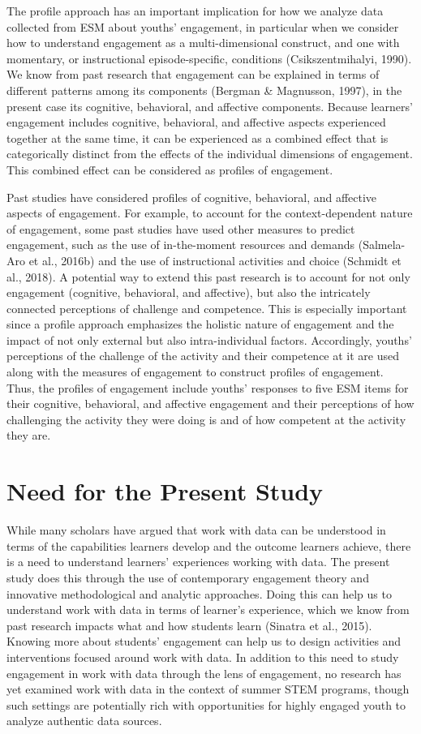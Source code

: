 \documentclass[]{book}
\theoremstyle{definition}
\theoremstyle{definition}
\theoremstyle{definition}
\theoremstyle{remark}
\begin{document}
The profile approach has an important implication for how we analyze
data collected from ESM about youths' engagement, in particular when we
consider how to understand engagement as a multi-dimensional construct,
and one with momentary, or instructional episode-specific, conditions
(Csikszentmihalyi, 1990). We know from past research that engagement can
be explained in terms of different patterns among its components
(Bergman \& Magnusson, 1997), in the present case its cognitive,
behavioral, and affective components. Because learners' engagement
includes cognitive, behavioral, and affective aspects experienced
together at the same time, it can be experienced as a combined effect
that is categorically distinct from the effects of the individual
dimensions of engagement. This combined effect can be considered as
profiles of engagement.

Past studies have considered profiles of cognitive, behavioral, and
affective aspects of engagement. For example, to account for the
context-dependent nature of engagement, some past studies have used
other measures to predict engagement, such as the use of in-the-moment
resources and demands (Salmela-Aro et al., 2016b) and the use of
instructional activities and choice (Schmidt et al., 2018). A potential
way to extend this past research is to account for not only engagement
(cognitive, behavioral, and affective), but also the intricately
connected perceptions of challenge and competence. This is especially
important since a profile approach emphasizes the holistic nature of
engagement and the impact of not only external but also intra-individual
factors. Accordingly, youths' perceptions of the challenge of the
activity and their competence at it are used along with the measures of
engagement to construct profiles of engagement. Thus, the profiles of
engagement include youths' responses to five ESM items for their
cognitive, behavioral, and affective engagement and their perceptions of
how challenging the activity they were doing is and of how competent at
the activity they are.

\section{Need for the Present Study}\label{need-for-the-present-study}

While many scholars have argued that work with data can be understood in
terms of the capabilities learners develop and the outcome learners
achieve, there is a need to understand learners' experiences working
with data. The present study does this through the use of contemporary
engagement theory and innovative methodological and analytic approaches.
Doing this can help us to understand work with data in terms of
learner's experience, which we know from past research impacts what and
how students learn (Sinatra et al., 2015). Knowing more about students'
engagement can help us to design activities and interventions focused
around work with data. In addition to this need to study engagement in
work with data through the lens of engagement, no research has yet
examined work with data in the context of summer STEM programs, though
such settings are potentially rich with opportunities for highly engaged
youth to analyze authentic data sources.
\end{document}
